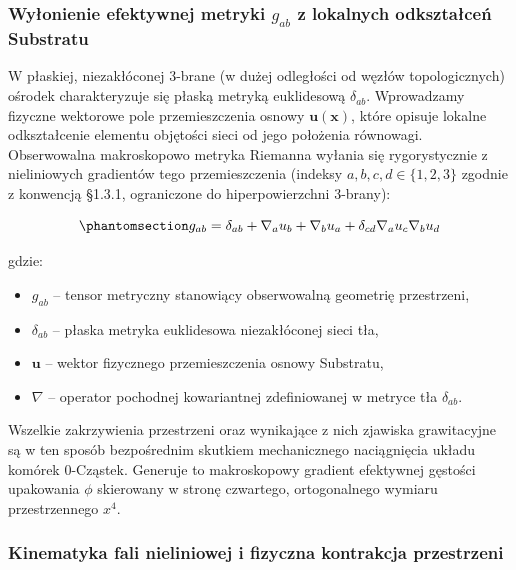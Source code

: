 \documentclass[
  polish,
  letterpaper,
  DIV=11,
  numbers=noendperiod,
  oneside]{scrartcl}
\providecommand{\tightlist}{%
  \setlength{\itemsep}{0pt}\setlength{\parskip}{0pt}}
\begin{document}
\subsubsection{\texorpdfstring{Wyłonienie efektywnej metryki \(g_{ab}\)
z lokalnych odkształceń
Substratu}{Wyłonienie efektywnej metryki g\_\{ab\} z lokalnych odkształceń Substratu}}\label{sec-1-4-1}

W płaskiej, niezakłóconej 3-brane (w dużej odległości od węzłów
topologicznych) ośrodek charakteryzuje się płaską metryką euklidesową
\(\delta_{ab}\). Wprowadzamy fizyczne wektorowe pole przemieszczenia
osnowy \(\mathbf{u}(\mathbf{x})\), które opisuje lokalne odkształcenie
elementu objętości sieci od jego położenia równowagi. Obserwowalna
makroskopowo metryka Riemanna wyłania się rygorystycznie z nieliniowych
gradientów tego przemieszczenia (indeksy \(a,b,c,d\in\{1,2,3\}\) zgodnie
z konwencją §1.3.1, ograniczone do hiperpowierzchni 3-brany):

\begin{equation}\protect\phantomsection\label{eq-1-4-1}{g_{ab} = \delta_{ab} + \nabla_a u_b + \nabla_b u_a + \delta_{cd} \nabla_a u_c \nabla_b u_d}\end{equation}

gdzie:

\begin{itemize}
\tightlist
\item
  \(g_{ab}\) -- tensor metryczny stanowiący obserwowalną geometrię
  przestrzeni,
\item
  \(\delta_{ab}\) -- płaska metryka euklidesowa niezakłóconej sieci tła,
\item
  \(\mathbf{u}\) -- wektor fizycznego przemieszczenia osnowy Substratu,
\item
  \(\nabla\) -- operator pochodnej kowariantnej zdefiniowanej w metryce
  tła \(\delta_{ab}\).
\end{itemize}

Wszelkie zakrzywienia przestrzeni oraz wynikające z nich zjawiska
grawitacyjne są w ten sposób bezpośrednim skutkiem mechanicznego
naciągnięcia układu komórek 0-Cząstek. Generuje to makroskopowy gradient
efektywnej gęstości upakowania \(\phi\) skierowany w stronę czwartego,
ortogonalnego wymiaru przestrzennego \(x^4\).

\subsubsection{Kinematyka fali nieliniowej i fizyczna kontrakcja
przestrzeni}\label{sec-1-4-2}
\end{document}
